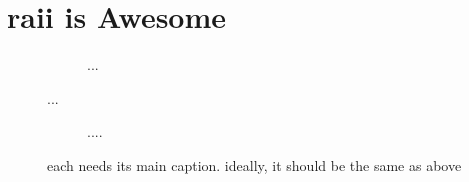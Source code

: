 %
%
%

\chapter{\texorpdfstring{\Acrshort{raii}}{RAII} is Awesome}
\label{appendix:listings}

% 

\begin{figure}[ht]
  \begin{center}
    \begin{subfigure}[t]{0.48\textwidth} %
      \caption{...}
    \end{subfigure}
  \end{center}
  \caption{...}
\end{figure}

\begin{figure}[ht]
  \ContinuedFloat
  \begin{center}
    \begin{subfigure}[t]{0.48\textwidth}
      \caption{....}
    \end{subfigure}
  \end{center}
  \caption{each needs its main caption. ideally, it should be the same as above}
\end{figure}


